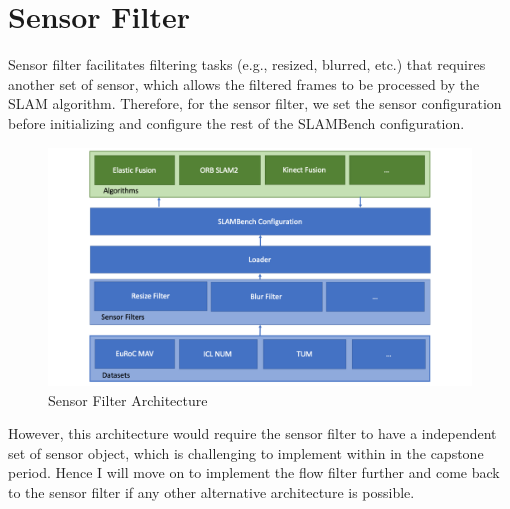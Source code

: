 
\section{Sensor Filter}

Sensor filter facilitates filtering tasks (e.g., resized, blurred, etc.) that requires another set of sensor, which allows the filtered frames to be processed by the SLAM algorithm. 
Therefore, for the sensor filter, we set the sensor configuration before initializing and configure the rest of the SLAMBench configuration. 

\begin{figure}[!htbp]
	\caption{\label{fig:sensorarc}Sensor Filter Architecture}
	\includegraphics[width=14cm]{figures/sensor-filter-architecture.png}
	\centering
\end{figure}

However, this architecture would require the sensor filter to have a independent set of sensor object, which is challenging to implement within in the capstone period. Hence I will move on to implement the flow filter further and come back to the sensor filter if any other alternative architecture is possible.






